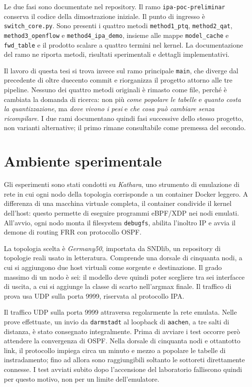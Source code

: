 \documentclass[binding=0.6cm,italian,oneside,noexaminfo]{sapthesis}
\begin{document}
Le due fasi sono documentate nel repository. Il ramo \texttt{ipa-poc-preliminar} conserva il codice della dimostrazione iniziale. Il punto di ingresso è \texttt{switch\_core.py}. Sono presenti i quattro metodi \texttt{method1\_ptq}, \texttt{method2\_qat}, \texttt{method3\_openflow} e \texttt{method4\_ipa\_demo}, insieme alle mappe \texttt{model\_cache} e \texttt{fwd\_table} e il prodotto scalare a quattro termini nel kernel. La documentazione del ramo ne riporta metodi, risultati sperimentali e dettagli implementativi.

Il lavoro di questa tesi si trova invece sul ramo principale \texttt{main}, che diverge dal precedente di oltre duecento commit e riorganizza il progetto attorno alle tre pipeline. Nessuno dei quattro metodi originali è rimasto come file, perché è cambiata la domanda di ricerca: non più \emph{come popolare le tabelle} e \emph{quanto costa la quantizzazione}, ma \emph{dove vivono i pesi} e \emph{che cosa può cambiare senza ricompilare}. I due rami documentano quindi fasi successive dello stesso progetto, non varianti alternative; il primo rimane consultabile come premessa del secondo.

\section{Ambiente sperimentale}
\label{sec:lab}

Gli esperimenti sono stati condotti su \emph{Kathara}, uno strumento di emulazione di rete in cui ogni nodo della topologia corrisponde a un container Docker leggero. A differenza di una macchina virtuale completa, il container condivide il kernel dell'host: questo permette di eseguire programmi eBPF/XDP nei nodi emulati. All'avvio, ogni nodo monta il filesystem \texttt{debugfs}, abilita l'inoltro IP e avvia il demone di routing FRR con protocollo OSPF.

La topologia scelta è \emph{Germany50}, importata da SNDlib, un repository di topologie reali usato in letteratura. Comprende una dorsale di cinquanta nodi, a cui si aggiungono due host virtuali come sorgente e destinazione. Il grado massimo di un nodo è sei: il modello deve quindi poter scegliere tra sei interfacce di uscita, a cui si aggiunge la classe di scarto nell'argmax finale. Il traffico di prova usa UDP sulla porta 9999, riservata al protocollo IPA.

Il traffico UDP sulla porta 9999 attraversa regolarmente la rete emulata. Nelle prove effettuate, un invio da \texttt{darmstadt} al loopback di \texttt{aachen}, a tre salti di distanza, è stato consegnato integralmente. Prima di avviare i test occorre però attendere la convergenza di OSPF. Nella dorsale di cinquanta nodi e ottantotto link, il protocollo impiega circa un minuto e mezzo a popolare le tabelle di instradamento; fino ad allora sono raggiungibili soltanto le sottoreti direttamente connesse. I test avviati subito dopo l'accensione del laboratorio falliscono quindi per questo motivo, non per un limite dell'emulatore.
\end{document}
